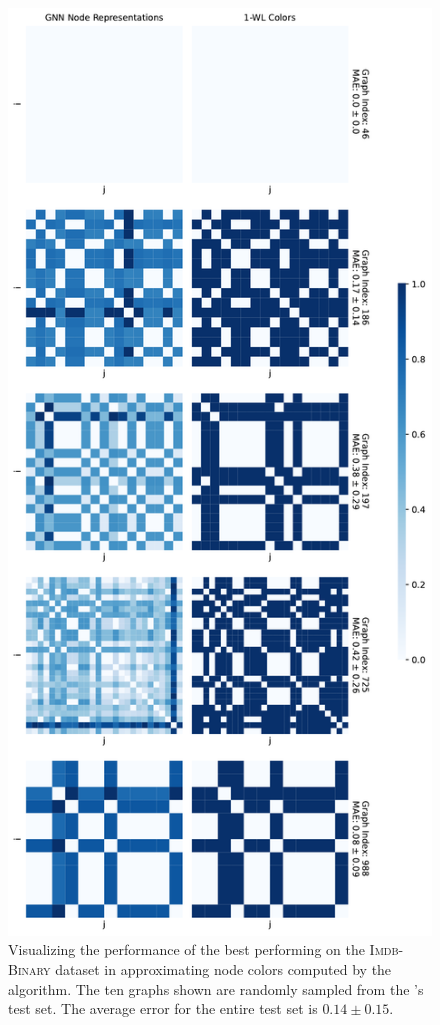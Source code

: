 \begin{figure}[H]
\begin{minipage}[b]{0.45992852703\textwidth}
    \end{minipage}
    \hfill
    \begin{minipage}[b]{0.53007147296\textwidth}
        \includegraphics[width=\textwidth, right]{Figures/heatmaps_IMDB-BINARY_1.pdf}
    \end{minipage}
    \hfill
    \caption{Visualizing the performance of the best performing \gnn on the \textsc{Imdb-Binary} dataset in approximating node colors computed by the \wl algorithm. The ten graphs shown are randomly sampled from the \gnn's test set. The average error for the entire test set is $0.14 \pm 0.15$.}
    \label{fig:gnn_approx_imdb}
\end{figure}
\clearpage

